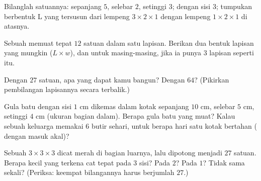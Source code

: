 \begin{exercise}[$\star$]\label{exo:g5:solids:6}
Bilanglah  satuannya:  sepanjang $5$, selebar $2$,
setinggi $3$;  dengan sisi $3$; tumpukan berbentuk L yang
tersusun dari lempeng $3 \times 2 \times 1$ dengan lempeng
$1 \times 2 \times 1$ di atasnya.
\end{exercise}

\begin{exercise}[$\star$]\label{exo:g5:solids:7}
Sebuah  memuat tepat $12$  satuan dalam satu lapisan.
Berikan dua bentuk lapisan yang mungkin ($L \times w$), dan untuk
masing-masing,   jika ia punya $3$ lapisan seperti itu.
\end{exercise}

\begin{exercise}[$\star$]\label{exo:g5:solids:8}
Dengan $27$  satuan,  apa yang dapat kamu bangun? Dengan
$64$? (Pikirkan pembilangan lapisannya secara terbalik.)
\end{exercise}

\begin{exercise}[$\star\star$]\label{exo:g5:solids:9}
Gula batu dengan sisi $1$ cm dikemas dalam kotak sepanjang $10$ cm,
selebar $5$ cm, setinggi $4$ cm (ukuran bagian dalam). Berapa gula
batu yang muat? Kalau sebuah keluarga memakai $6$ butir sehari,
untuk berapa hari satu kotak bertahan ( dengan masuk akal)?
\end{exercise}

\begin{exercise}[$\star\star$]\label{exo:g5:solids:10}
Sebuah  $3 \times 3 \times 3$ dicat merah di bagian luarnya,
lalu dipotong menjadi $27$  satuan. Berapa  kecil yang
terkena cat tepat pada $3$ sisi? Pada $2$? Pada $1$? Tidak sama
sekali? (Periksa: keempat bilangannya harus berjumlah $27$.)

\end{exercise}
